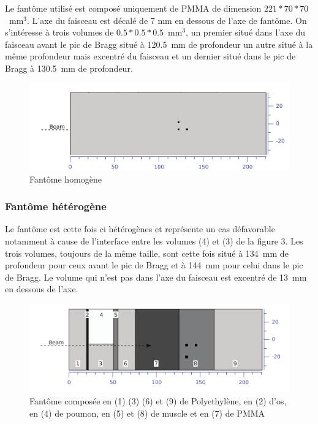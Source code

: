 \documentclass[11pt,a4paper,oldfontcommands]{memoir}
\begin{document}
Le fantôme utilisé est composé uniquement de PMMA de dimension $221*70*70$~mm$^3$. L'axe du faisceau est décalé de 7 mm en dessous de l'axe de fantôme. On s'intéresse à trois volumes de $0.5*0.5*0.5$~mm$^3$, un premier situé dans l'axe du faisceau avant le pic de Bragg situé à 120.5~mm de profondeur un autre situé à la même profondeur mais excentré du faisceau et un dernier situé dans le pic de Bragg à 130.5~mm de profondeur.\\
\begin{figure}[h!]
    \centering
    \includegraphics[scale = 0.3]{homo/homofant.png}
    \caption{Fantôme homogène}
    \label{fant homo}
\end{figure}{}



\openany
\subsubsection{Fantôme hétérogène}

Le fantôme est cette fois ci hétérogènes et représente un cas défavorable notamment à cause de l'interface entre les volumes (4) et (3) de la figure 3. Les trois volumes, toujours de la même taille, sont cette fois situé à 134~mm de profondeur pour ceux avant le pic de Bragg et à 144~mm pour celui dans le pic de Bragg. Le volume qui n'est pas dans l'axe du faisceau est excentré de 13~mm en dessous de l'axe. 

\begin{figure}[h]
    \centering
    \includegraphics[scale = 0.3]{Parodi/heterofant.png}
    \caption{Fantôme composée en (1) (3) (6) et (9) de Polyethylène, en (2) d'os, en (4) de poumon, en (5) et (8) de muscle et en (7) de PMMA}
    \label{hetero phant}
\end{figure}{}
\end{document}
